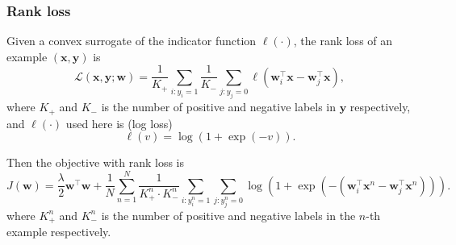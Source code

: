 \documentclass[9pt]{extarticle}
\newcommand{\x}{\mathbf{x}}
\newcommand{\y}{\mathbf{y}}
\newcommand{\1}{\mathbf{1}}
\newcommand{\w}{\mathbf{w}}
\newcommand{\LCal}{\mathcal{L}}
\newcommand{\pb}[1]{^{({#1})}}
\begin{document}
\subsubsection{Rank loss}
\label{sssec:rank}

Given a convex surrogate of the indicator function $\ell(\cdot)$, 
the rank loss of an example $(\x, \y)$ is
\begin{equation*}
\LCal(\x, \y; \w) = \frac{1}{K_+} \sum_{i: y_i = 1} \frac{1}{K_-} \sum_{j: y_j = 0} \ell(\w_i^\top \x - \w_j^\top \x),
\end{equation*}
where $K_+$ and $K_-$ is the number of positive and negative labels in $\y$ respectively, 
and $\ell(\cdot)$ used here is (log loss)
\begin{equation*}
\ell(v) = \log(1 + \exp(-v)).
\end{equation*}

Then the objective with rank loss is
\begin{equation}
\label{eq:obj_rank}
J(\w) = \frac{\lambda}{2} \w^\top \w + \frac{1}{N} \sum_{n=1}^N \frac{1}{K_+^n \cdot K_-^n} \sum_{i:y_i^n=1} \sum_{j:y_j^n=0} 
        \log \left( 1 + \exp \left( - \left( \w_i^\top \x^n - \w_j^\top \x^n \right) \right) \right).
\end{equation}
where $K_+^n$ and $K_-^n$ is the number of positive and negative labels in the $n$-th example respectively.

\end{document}

